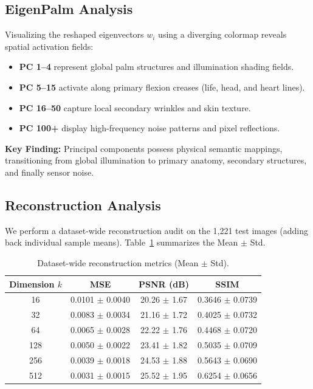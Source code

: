 \documentclass[conference]{IEEEtran}
\begin{document}
\subsection{EigenPalm Analysis}
Visualizing the reshaped eigenvectors $w_i$ using a diverging colormap reveals spatial activation fields:
\begin{itemize}
    \item \textbf{PC 1--4} represent global palm structures and illumination shading fields.
    \item \textbf{PC 5--15} activate along primary flexion creases (life, head, and heart lines).
    \item \textbf{PC 16--50} capture local secondary wrinkles and skin texture.
    \item \textbf{PC 100+} display high-frequency noise patterns and pixel reflections.
\end{itemize}
\textbf{Key Finding:} Principal components possess physical semantic mappings, transitioning from global illumination to primary anatomy, secondary structures, and finally sensor noise.

\subsection{Reconstruction Analysis}
We perform a dataset-wide reconstruction audit on the 1,221 test images (adding back individual sample means). Table~\ref{tab:reconstruction} summarizes the Mean $\pm$ Std. 

\begin{table}[h]
\centering
\caption{Dataset-wide reconstruction metrics (Mean $\pm$ Std).}
\label{tab:reconstruction}
\begin{tabular}{@{}cccc@{}}
\toprule
\textbf{Dimension $k$} & \textbf{MSE} & \textbf{PSNR (dB)} & \textbf{SSIM} \\
\midrule
16  & 0.0101 $\pm$ 0.0040 & 20.26 $\pm$ 1.67 & 0.3646 $\pm$ 0.0739 \\
32  & 0.0083 $\pm$ 0.0034 & 21.16 $\pm$ 1.72 & 0.4025 $\pm$ 0.0732 \\
64  & 0.0065 $\pm$ 0.0028 & 22.22 $\pm$ 1.76 & 0.4468 $\pm$ 0.0720 \\
128 & 0.0050 $\pm$ 0.0022 & 23.41 $\pm$ 1.82 & 0.5035 $\pm$ 0.0709 \\
256 & 0.0039 $\pm$ 0.0018 & 24.53 $\pm$ 1.88 & 0.5643 $\pm$ 0.0690 \\
512 & 0.0031 $\pm$ 0.0015 & 25.52 $\pm$ 1.95 & 0.6254 $\pm$ 0.0656 \\
\bottomrule
\end{tabular}
\end{table}
\end{document}
